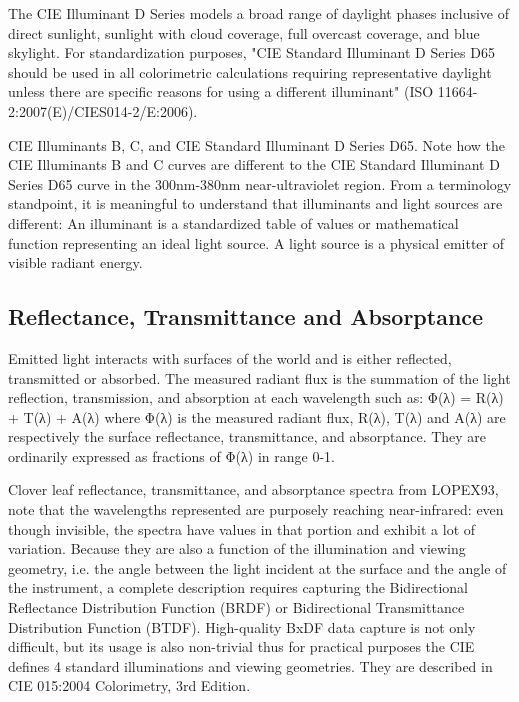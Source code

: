 The CIE Illuminant D Series models a broad range of daylight phases inclusive of direct sunlight, sunlight with cloud coverage, full overcast coverage, and blue skylight. For standardization purposes, "CIE Standard Illuminant D Series D65 should be used in all colorimetric calculations requiring representative daylight unless there are specific reasons for using a different illuminant" (ISO 11664-2:2007(E)/CIES014-2/E:2006).

CIE Illuminants B, C, and CIE Standard Illuminant D Series D65. Note how the CIE Illuminants B and C curves are different to the CIE Standard Illuminant D Series D65 curve in the 300nm-380nm near-ultraviolet region.
From a terminology standpoint, it is meaningful to understand that illuminants and light sources are different:
An illuminant is a standardized table of values or mathematical function representing an ideal light source.
A light source is a physical emitter of visible radiant energy.

\subsection{Reflectance, Transmittance and Absorptance}%
\label{subsec:reflectance-transmittance-and-absorptance}

Emitted light interacts with surfaces of the world and is either reflected, transmitted or absorbed. The measured radiant flux is the summation of the light reflection, transmission, and absorption at each wavelength such as:
Φ(λ) = R(λ) + T(λ) + A(λ)
where Φ(λ) is the measured radiant flux, R(λ), T(λ) and A(λ) are respectively the surface reflectance, transmittance, and absorptance. They are ordinarily expressed as fractions of Φ(λ) in range 0-1.

Clover leaf reflectance, transmittance, and absorptance spectra from LOPEX93, note that the wavelengths represented are purposely reaching near-infrared: even though invisible, the spectra have values in that portion and exhibit a lot of variation.
Because they are also a function of the illumination and viewing geometry, i.e. the angle between the light incident at the surface and the angle of the instrument, a complete description requires capturing the Bidirectional Reflectance Distribution Function (BRDF) or Bidirectional Transmittance Distribution Function (BTDF). High-quality BxDF data capture is not only difficult, but its usage is also non-trivial thus for practical purposes the CIE defines 4 standard illuminations and viewing geometries. They are described in CIE 015:2004 Colorimetry, 3rd Edition.

